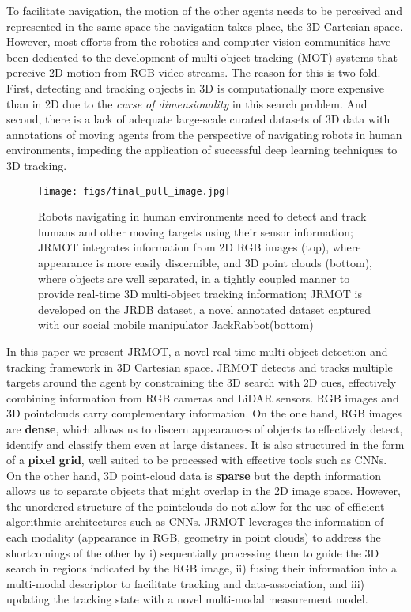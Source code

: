 \documentclass[letterpaper, 10 pt, conference]{ieeeconf}
\newcommand{\jrdb}{JRDB\xspace}
\newcommand{\jackrabbot}{JackRabbot\xspace}
\newcommand{\methodname}{{JRMOT}\xspace}
\begin{document}
To facilitate navigation, the motion of the other agents needs to be perceived and represented in the same space the navigation takes place, the 3D Cartesian space.
However, most efforts from the robotics and computer vision communities have been dedicated to the development of multi-object tracking (MOT) systems that perceive 2D motion from RGB video streams. The reason for this is two fold. First, detecting and tracking objects in 3D is computationally more expensive than in 2D due to the \textit{curse of dimensionality} in this search problem. And second, there is a lack of adequate large-scale curated datasets of 3D data with annotations of moving agents from the perspective of navigating robots in human environments, impeding the application of successful deep learning techniques to 3D tracking. 

\begin{figure}[t]
\centering
\texttt{[image: figs/final\_pull\_image.jpg]}
\caption{Robots navigating in human environments need to detect and track humans and other moving targets using their sensor information; \methodname integrates information from 2D RGB images (top), where appearance is more easily discernible, and 3D point clouds (bottom), where objects are well separated, in a tightly coupled manner to provide real-time 3D multi-object tracking information; \methodname is developed on the \jrdb dataset, a novel annotated dataset captured  with our social mobile manipulator \jackrabbot (bottom)}
\label{fig:pull}
\end{figure}

In this paper we present \methodname, a novel real-time multi-object detection and tracking framework in 3D Cartesian space. \methodname detects and tracks multiple targets around the agent by constraining the 3D search with 2D cues, effectively combining information from RGB cameras and LiDAR sensors. RGB images and 3D pointclouds carry complementary information.
On the one hand, RGB images are \textbf{dense}, which allows us to discern appearances of objects to effectively detect, identify and classify them even at large distances. It is also structured in the form of a \textbf{pixel grid}, well suited to be processed with effective tools such as CNNs. 
On the other hand, 3D point-cloud data is \textbf{sparse} but the depth information allows us to separate objects that might overlap in the 2D image space. However, the unordered structure of the pointclouds do not allow for the use of efficient algorithmic architectures such as CNNs.
\methodname leverages the information of each modality (appearance in RGB, geometry in point clouds) to address the shortcomings of the other by i) sequentially processing them to guide the 3D search in regions indicated by the RGB image, ii) fusing their information into a multi-modal descriptor to facilitate tracking and data-association, and iii) updating the tracking state with a novel multi-modal measurement model.
\end{document}
